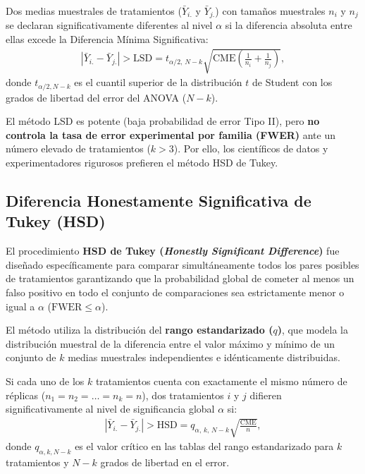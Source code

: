 \begin{teorema}
	Dos medias muestrales de tratamientos ($\bar{Y}_{i.}$ y $\bar{Y}_{j.}$) con tamaños muestrales $n_i$ y $n_j$ se declaran significativamente diferentes al nivel $\alpha$ si la diferencia absoluta entre ellas excede la Diferencia Mínima Significativa:
	\begin{align}
		|\bar{Y}_{i.} - \bar{Y}_{j.}| > \text{LSD} = t_{\alpha/2, \, N-k} \sqrt{\text{CME} \left( \frac{1}{n_i} + \frac{1}{n_j} \right)},
	\end{align}
	donde $t_{\alpha/2, N-k}$ es el cuantil superior de la distribución $t$ de Student con los grados de libertad del error del ANOVA ($N-k$).
\end{teorema}

\begin{observacion}
	El método LSD es potente (baja probabilidad de error Tipo II), pero \textbf{no controla la tasa de error experimental por familia (FWER)} ante un número elevado de tratamientos ($k > 3$). Por ello, los científicos de datos y experimentadores rigurosos prefieren el método HSD de Tukey.
\end{observacion}

\subsection*{Diferencia Honestamente Significativa de Tukey (HSD)}

El procedimiento \textbf{HSD de Tukey (\emph{Honestly Significant Difference})} fue diseñado específicamente para comparar simultáneamente todos los pares posibles de tratamientos garantizando que la probabilidad global de cometer al menos un falso positivo en todo el conjunto de comparaciones sea estrictamente menor o igual a $\alpha$ ($\text{FWER} \leq \alpha$).

El método utiliza la distribución del \textbf{rango estandarizado ($q$)}, que modela la distribución muestral de la diferencia entre el valor máximo y mínimo de un conjunto de $k$ medias muestrales independientes e idénticamente distribuidas.

\begin{teorema}
	Si cada uno de los $k$ tratamientos cuenta con exactamente el mismo número de réplicas ($n_1 = n_2 = \ldots = n_k = n$), dos tratamientos $i$ y $j$ difieren significativamente al nivel de significancia global $\alpha$ si:
	\begin{align}
		|\bar{Y}_{i.} - \bar{Y}_{j.}| > \text{HSD} = q_{\alpha, \, k, \, N-k} \sqrt{\frac{\text{CME}}{n}},
		\label{eq:tukey_hsd}
	\end{align}
	donde $q_{\alpha, k, N-k}$ es el valor crítico en las tablas del rango estandarizado para $k$ tratamientos y $N-k$ grados de libertad en el error.
\end{teorema}

